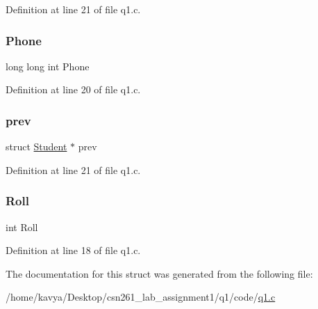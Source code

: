 Definition at line 21 of file q1.\+c.

\mbox{\label{struct_student_a097ef0dc0739c67e89950dec9f3c1446}} 
\subsubsection{\texorpdfstring{Phone}{Phone}}
{\footnotesize\ttfamily long long int Phone}



Definition at line 20 of file q1.\+c.

\mbox{\label{struct_student_acccaf7a7261d26814e081163b772728f}} 
\subsubsection{\texorpdfstring{prev}{prev}}
{\footnotesize\ttfamily struct \hyperlink{struct_student}{Student} $\ast$ prev}



Definition at line 21 of file q1.\+c.

\mbox{\label{struct_student_abf08303c7c1c86949317530985b66f65}} 
\subsubsection{\texorpdfstring{Roll}{Roll}}
{\footnotesize\ttfamily int Roll}



Definition at line 18 of file q1.\+c.



The documentation for this struct was generated from the following file\+:\begin{DoxyCompactItemize}
\item 
/home/kavya/\+Desktop/csn261\+\_\+lab\+\_\+assignment1/q1/code/\hyperlink{q1_8c}{q1.\+c}\end{DoxyCompactItemize}
